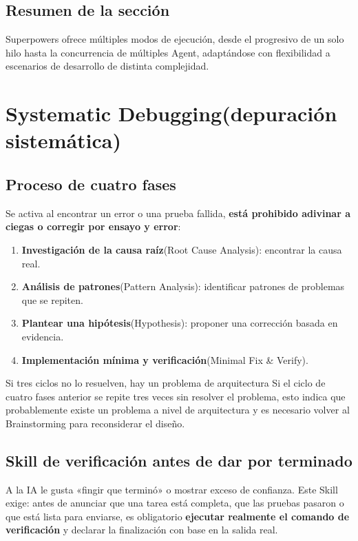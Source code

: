 \documentclass[a4paper]{article}
\begin{document}
\subsection{Resumen de la sección}

Superpowers ofrece múltiples modos de ejecución, desde el progresivo de un solo hilo hasta la concurrencia de múltiples Agent, adaptándose con flexibilidad a escenarios de desarrollo de distinta complejidad.

\section{Systematic Debugging(depuración sistemática)}

\subsection{Proceso de cuatro fases}

Se activa al encontrar un error o una prueba fallida, \textbf{está prohibido adivinar a ciegas o corregir por ensayo y error}:

\begin{enumerate}
    \item \textbf{Investigación de la causa raíz}(Root Cause Analysis): encontrar la causa real.
    \item \textbf{Análisis de patrones}(Pattern Analysis): identificar patrones de problemas que se repiten.
    \item \textbf{Plantear una hipótesis}(Hypothesis): proponer una corrección basada en evidencia.
    \item \textbf{Implementación mínima y verificación}(Minimal Fix \& Verify).
\end{enumerate}

\begin{warningbox}{Si tres ciclos no lo resuelven, hay un problema de arquitectura}
Si el ciclo de cuatro fases anterior se repite tres veces sin resolver el problema, esto indica que probablemente existe un problema a nivel de arquitectura y es necesario volver al Brainstorming para reconsiderar el diseño.
\end{warningbox}

\subsection{Skill de verificación antes de dar por terminado}

A la IA le gusta «fingir que terminó» o mostrar exceso de confianza. Este Skill exige: antes de anunciar que una tarea está completa, que las pruebas pasaron o que está lista para enviarse, es obligatorio \textbf{ejecutar realmente el comando de verificación} y declarar la finalización con base en la salida real.
\end{document}
